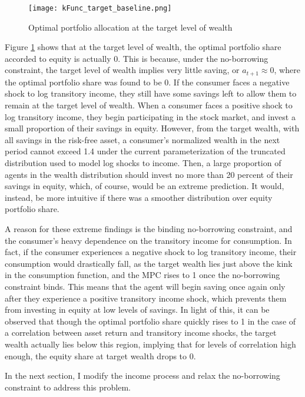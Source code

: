 \begin{figure}[h]
    \centering
    \texttt{[image: kFunc\_target\_baseline.png]}
    \caption{Optimal portfolio allocation at the target level of wealth}
    \label{fig:target_wealth_portfolio}
\end{figure}
Figure \ref{fig:target_wealth_portfolio} shows that at the target level of wealth, the optimal portfolio share accorded to equity is actually 0. This is because, under the no-borrowing constraint, the target level of wealth implies very little saving, or $a_{t+1} \approx 0$, where the optimal portfolio share was found to be $0$. If the consumer faces a negative shock to log transitory income, they still have some savings left to allow them to remain at the target level of wealth. When a consumer faces a positive shock to log transitory income, they begin participating in the stock market, and invest a small proportion of their savings in equity. However, from the target wealth, with all savings in the risk-free asset, a consumer's normalized wealth in the next period cannot exceed 1.4 under the current parameterization of the truncated distribution used to model log shocks to income. Then, a large proportion of agents in the wealth distribution should invest no more than 20 percent of their savings in equity, which, of course, would be an extreme prediction. It would, instead, be more intuitive if there was a smoother distribution over equity portfolio share.

A reason for these extreme findings is the binding no-borrowing constraint, and the consumer's heavy dependence on the transitory income for consumption. In fact, if the consumer experiences a negative shock to log transitory income, their consumption would drastically fall, as the target wealth lies just above the kink in the consumption function, and the MPC rises to 1 once the no-borrowing constraint binds. This means that the agent will begin saving once again only after they experience a positive transitory income shock, which prevents them from investing in equity at low levels of savings. In light of this, it can be observed that though the optimal portfolio share quickly rises to 1 in the case of a correlation between asset return and transitory income shocks, the target wealth actually lies below this region, implying that for levels of correlation high enough, the equity share at target wealth drops to 0.

In the next section, I modify the income process and relax the no-borrowing constraint to address this problem.